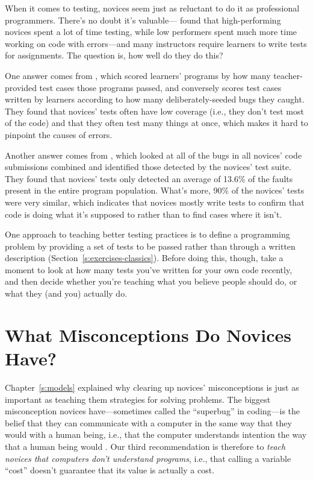 When it comes to testing, novices seem just as reluctant to do it as
professional programmers. There's no doubt it's
valuable---\cite{Cart2017} found that high-performing novices spent a
lot of time testing, while low performers spent much more time working
on code with errors---and many instructors require learners to write tests
for assignments. The question is, how well do they do this?

One answer comes from \cite{Bria2015}, which scored learners'
programs by how many teacher-provided test cases those programs passed,
and conversely scores test cases written by learners according to how
many deliberately-seeded bugs they caught. They found that novices'
tests often have low coverage (i.e., they don't test most of the code)
and that they often test many things at once, which makes it hard to
pinpoint the causes of errors.

Another answer comes from \cite{Edwa2014b}, which looked at all of
the bugs in all novices' code submissions combined and identified those
detected by the novices' test suite. They found that novices' tests only
detected an average of 13.6\% of the faults present in the entire program
population. What's more, 90\% of the novices' tests were very similar,
which indicates that novices mostly write tests to confirm that code is
doing what it's supposed to rather than to find cases where it isn't.

One approach to teaching better testing practices is to define a
programming problem by providing a set of tests to be passed rather than
through a written description (Section~\ref{s:exercises-classics}).
Before doing this, though, take a moment to look at how many tests
you've written for your own code recently, and then decide whether
you're teaching what you believe people should do, or what they (and
you) actually do.

\section{What Misconceptions Do Novices Have?}\label{s:pck-misunderstand}

Chapter~\ref{s:models} explained why clearing up novices' misconceptions
is just as important as teaching them strategies for solving problems.
The biggest misconception novices have---sometimes called the ``superbug''
in coding---is the belief that they can communicate with a computer in the
same way that they would with a human being, i.e., that the computer
understands intention the way that a human being would
\cite{Pea1986}. Our third recommendation is therefore to \emph{teach
novices that computers don't understand programs}, i.e., that calling a
variable ``cost'' doesn't guarantee that its value is actually a cost.

